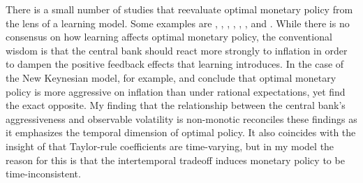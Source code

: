 \documentclass[11pt]{article}
\renewcommand{\[}{\begin{equation}}
\renewcommand{\]}{\end{equation}}
\begin{document}
%

There is a small number of studies that reevaluate optimal monetary policy from the lens of a learning model. Some examples are \cite{orphanides2005decline}, \cite{gaspar2006adaptive}, \cite{evans2006monetary}, \cite{ferrero2007monetary}, \cite{PRESTON2008}, \cite{molnar2014optimal}, \cite{eusepi2018science} and \cite{eusepi2018limits}. While there is no consensus on how learning affects optimal monetary policy, the conventional wisdom is that the central bank should react more strongly to inflation in order to dampen the positive feedback effects that learning introduces. In the case of the New Keynesian model, for example, \cite{eusepi2018science} and \cite{molnar2014optimal} conclude that optimal monetary policy is more aggressive on inflation than under rational expectations, yet \cite{eusepi2018limits} find the exact opposite. My finding that the relationship between the central bank's aggressiveness and observable volatility is non-monotic reconciles these findings as it emphasizes the temporal dimension of optimal policy. It also coincides with the insight of \cite{LUBIK201685} that Taylor-rule coefficients are time-varying, but in my model the reason for this is that the intertemporal tradeoff induces monetary policy to be time-inconsistent.
\end{document}

